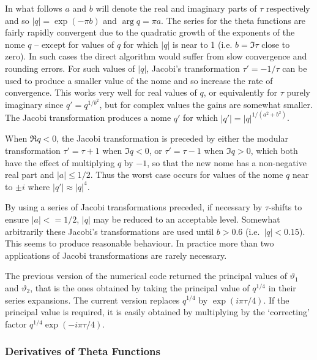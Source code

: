 In what follows $a$ and $b$ will denote the real and imaginary parts of
$\tau$ respectively and so $|q| = \exp(-\pi b)$ and $\arg q =\pi a$.
The series for the theta functions are fairly rapidly convergent
due to the quadratic growth of the exponents of the nome $q$ -- except
for values of $q$ for which $|q|$ is near to 1
(i.e. $b=\Im \tau $ close to zero).
In such cases the direct algorithm would suffer from slow convergence and
rounding errors.
For such values of $|q|$, Jacobi's transformation $\tau'=-1/\tau$ can be
used to produce a smaller value of the nome and so increase the rate of
convergence.
This works very well for real values of $q$, or equivalently for $\tau$ purely
imaginary since $q'= q^{1/b^2}$, but for complex
values the gains are somewhat smaller. The Jacobi transformation produces a
nome $q'$ for which $|q'| =  |q|^{1/(a^2+b^2)}$.

When $\Re q < 0$, the Jacobi transformation is preceded by either the
modular transformation $\tau' = \tau+1$ when $\Im q < 0$, or $\tau' = \tau-1$
when $\Im q > 0$, which both have the effect  of multiplying $q$ by $-1$,
so that the new nome has a non-negative real part and $|a| \leq 1/2$.
Thus the worst case occurs for values of the nome $q$ near to $\pm i$ where
$|q'| \approx |q|^4$.

By using a series of Jacobi transformations preceded, if necessary by
$\tau$-shifts to ensure $|a| <= 1/2$, $|q|$ may be reduced to an acceptable
level. Somewhat arbitrarily these Jacobi's transformations are used
until $b > 0.6$ (i.e.~$|q| < 0.15$). This seems to produce reasonable
behaviour. In practice more than two applications of Jacobi transformations
are rarely necessary.

The previous version of the numerical code returned the principal values
of $\vartheta_1$ and $\vartheta_2$, that is the ones obtained by taking
the principal value of $q^{1/4}$ in their series expansions. The current version replaces
$q^{1/4}$ by $\exp(i\pi\tau/4)$.  If the principal value is required, it is easily obtained
by multiplying by the `correcting' factor $q^{1/4}\exp(-i\pi\tau/4)$.

\subsubsection{Derivatives of Theta Functions}

